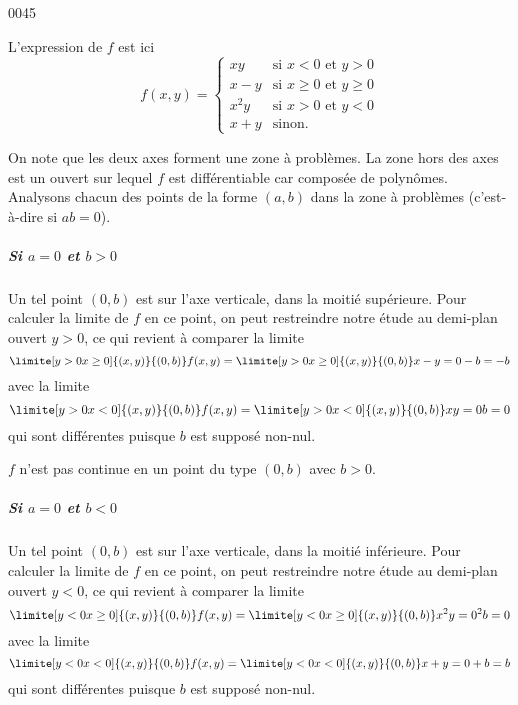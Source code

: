 
\begin{corrige}{0045}

L'expression de $f$ est ici
\begin{equation*}
  f(x,y) =
  \begin{cases}
    xy & \text{si $x < 0$ et $y > 0$}\\
    x-y & \text{si $x \geq 0$ et $y \geq 0$}\\
    x^2y & \text{si $x > 0$ et $y < 0$}\\
    x+y & \text{sinon.}
  \end{cases}
\end{equation*}

On note que les deux axes forment une zone à problèmes. La zone hors
des axes est un ouvert sur lequel $f$ est différentiable car composée
de polynômes. Analysons chacun des points de la forme $(a,b)$ dans la
zone à problèmes (c'est-à-dire si $ab = 0$).

\subparagraph{Si $a = 0$ et $b > 0$} Un tel point $(0,b)$ est sur
l'axe verticale, dans la moitié supérieure. Pour calculer la limite de
$f$ en ce point, on peut restreindre notre étude au demi-plan ouvert
$y > 0$, ce qui revient à comparer la limite
\begin{equation*}
  \limite[y>0\\x\geq 0] {(x,y)} {(0,b)} f(x,y) =   \limite[y>0\\x\geq
  0] {(x,y)} {(0,b)} x-y = 0 - b = -b
\end{equation*}
avec la limite
\begin{equation*}
  \limite[y>0\\x<0] {(x,y)} {(0,b)} f(x,y) =   \limite[y>0\\x<0]
  {(x,y)} {(0,b)} xy = 0 b = 0
\end{equation*}
qui sont différentes puisque $b$ est supposé non-nul.

\conclusion $f$ n'est pas continue en un point du type $(0,b)$ avec $b
> 0$.

\subparagraph{Si $a = 0$ et $b < 0$} Un tel point $(0,b)$ est sur
l'axe verticale, dans la moitié inférieure. Pour calculer la limite de
$f$ en ce point, on peut restreindre notre étude au demi-plan ouvert
$y < 0$, ce qui revient à comparer la limite
\begin{equation*}
  \limite[y<0\\x\geq 0] {(x,y)} {(0,b)} f(x,y) =   \limite[y<0\\x\geq
  0] {(x,y)} {(0,b)} x^2 y = 0^2 b = 0
\end{equation*}
avec la limite
\begin{equation*}
  \limite[y<0\\x<0] {(x,y)} {(0,b)} f(x,y) =   \limite[y<0\\x<0]
  {(x,y)} {(0,b)} x+y = 0 + b = b
\end{equation*}
qui sont différentes puisque $b$ est supposé non-nul.


\end{corrige}
